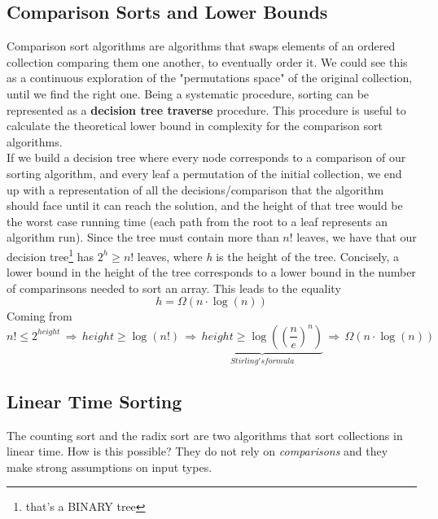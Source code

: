 \documentclass{article}
\begin{document}
		\subsection{Comparison Sorts and Lower Bounds}
			Comparison sort algorithms are algorithms that swaps elements of an ordered collection comparing them one another, to eventually order it. We could see this as a continuous exploration of the "permutations space" of the original collection, until we find the right one. Being a systematic procedure, sorting can be represented as a \textbf{decision tree traverse} procedure. This procedure is useful to calculate the theoretical lower bound in complexity for the comparison sort algorithms.\\
			If we build a decision tree where every node corresponds to a comparison of our sorting algorithm, and every leaf a permutation of the initial collection, we end up with a representation of all the decisions/comparison that the algorithm should face until it can reach the solution, and the height of that tree would be the worst case running time (each path from the root to a leaf represents an algorithm run). Since the tree must contain more than $n!$ leaves, we have that our decision tree\footnote{that's a BINARY tree} has $2^h \geq n!$ leaves, where \emph{h} is the height of the tree. Concisely, a lower bound in the height of the tree corresponds to a lower bound in the number of comparinsons needed to sort an array. This leads to the equality
			\begin{equation}
				h = \Omega(n \cdot \log (n))
			\end{equation}
			Coming from
			\begin{equation}
				n! \leq 2^{height} \,\Rightarrow\, height \geq \log(n!) \,\Rightarrow\, \underbrace{height \geq \log((\frac{n}{e})^n)}_{Stirling's formula} \,\Rightarrow\, \Omega(n \cdot \log(n))
			\end{equation}

		\subsection{Linear Time Sorting}
			The counting sort and the radix sort are two algorithms that sort collections in linear time. How is this possible? They do not rely on \textit{comparisons} and they make strong assumptions on input types.
\end{document}
